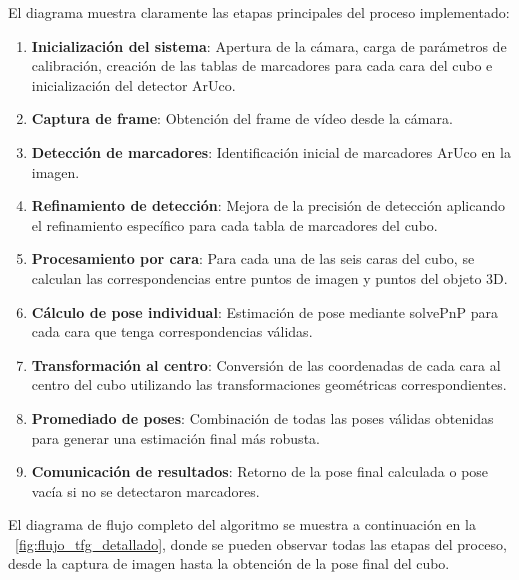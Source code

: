 El diagrama muestra claramente las etapas principales del proceso implementado:
\begin{enumerate}
    \item \textbf{Inicialización del sistema}: Apertura de la cámara, carga de parámetros de calibración, creación de las tablas de marcadores para cada cara del cubo e inicialización del detector ArUco.
    \item \textbf{Captura de frame}: Obtención del frame de vídeo desde la cámara.
    \item \textbf{Detección de marcadores}: Identificación inicial de marcadores ArUco en la imagen.
    \item \textbf{Refinamiento de detección}: Mejora de la precisión de detección aplicando el refinamiento específico para cada tabla de marcadores del cubo.
    \item \textbf{Procesamiento por cara}: Para cada una de las seis caras del cubo, se calculan las correspondencias entre puntos de imagen y puntos del objeto 3D.
    \item \textbf{Cálculo de pose individual}: Estimación de pose mediante solvePnP para cada cara que tenga correspondencias válidas.
    \item \textbf{Transformación al centro}: Conversión de las coordenadas de cada cara al centro del cubo utilizando las transformaciones geométricas correspondientes.
    \item \textbf{Promediado de poses}: Combinación de todas las poses válidas obtenidas para generar una estimación final más robusta.
    \item \textbf{Comunicación de resultados}: Retorno de la pose final calculada o pose vacía si no se detectaron marcadores.
\end{enumerate}

El diagrama de flujo completo del algoritmo se muestra a continuación en la \figurename~\ref{fig:flujo_tfg_detallado}, donde se pueden observar todas las etapas del proceso, desde la captura de imagen hasta la obtención de la pose final del cubo.

